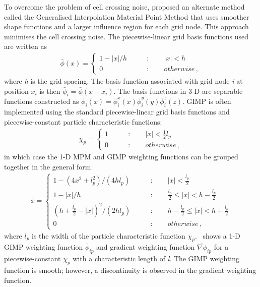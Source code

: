 To overcome the problem of cell crossing 
noise, \citet{Bardenhagen2004} proposed an alternate method called the 
Generalised Interpolation Material Point Method that uses smoother shape 
functions and a larger influence region for each grid node. This approach 
minimises the cell crossing noise. The piecewise-linear grid basis functions 
used are written as
%
\begin{align}
\bar{\phi}(x) = \begin{cases}
1-\left|x\right|/h \qquad &: \qquad \left|x\right| < h \\
0 \qquad &: \qquad otherwise \,,
\end{cases}
\end{align}
where \textit{h} is the grid spacing. The basis function associated with grid 
node \textit{i} at position $x_i$ is then $\bar{\phi}_i=\bar{\phi}(x - x_i)$. 
The basis 
functions in 3-D are separable functions constructed as $\bar{\phi}_i(x) = 
\bar{\phi}_i^x(x)
\bar{\phi}_i^y(y)\bar{\phi}_i^z(z)$. GIMP is often implemented using the 
standard 
piecewise-linear grid basis functions and piecewise-constant particle 
characteristic functions:
\begin{align}
\chi_p = \begin{cases}
1 \qquad &: \qquad \left|x\right| < \frac{1}{2}l_p \\
0 \qquad &: \qquad otherwise \,,
\end{cases}
\end{align}
%
in which case the 1-D MPM and GIMP weighting functions can be grouped together 
in the general form
%
\begin{align}
\bar{\phi} = \begin{cases}
1 - (4x^2+l_p^2)/(4hl_p)\qquad &: \qquad \left|x\right| < \frac{l_p}{2} \\
1 - \left|x\right|/h \qquad &: \qquad \frac{l_p}{2} \le \left|x\right| < h - 
\frac{l_p}{2} \\
\left(h +\frac{l_p}{2} - \left|x\right| \right)^2/(2hl_p) \qquad &: \qquad h - 
\frac{l_p}{2} \le \left|x\right| < h +
\frac{l_p}{2} \\
0 \qquad &: \qquad otherwise \,,
\end{cases}
\end{align}
%
where $l_p$ is the width of the particle characteristic function 
$\chi_p$.~ shows a 1-D GIMP weighting function $\bar{\phi}_{ip}$ 
and gradient weighting function $\bar{\nabla\phi}_{ip}$ for a 
piecewise-constant $\chi_p$ with a characteristic length of \textit{l}. The 
GIMP weighting function is smooth; however, a discontinuity is observed in the 
gradient weighting function. 


